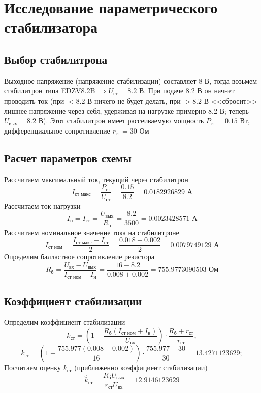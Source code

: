 \documentclass[a4paper, 12pt]{article}
\begin{document}
    \section{Исследование параметрического стабилизатора}
    \subsection{Выбор стабилитрона}
    Выходное напряжение (напряжение стабилизации) составляет 8 В, тогда возьмем стабилитрон типа EDZV8.2B $\Rightarrow U_{\text{ст}}=8.2$ В.
    При подаче 8.2 В он начнет проводить ток (при $<8.2$ В ничего не будет делать, при $>8.2$ В <<сбросит>>
    лишнее напряжение через себя, удерживая на нагрузке примерно 8.2 В; теперь $U_{\text{вых}}=8.2$ В). Этот стабилитрон имеет рассеиваемую
    мощность $P_\text{ст}=0.15$ Вт, дифференциальное сопротивление $r_{\text{ст}}=30$ Ом
    
    
    \subsection{Расчет параметров схемы}
    Рассчитаем максимальный ток, текущий
    через стабилитрон
    $$
    I_{\text{ст макс}}=\dfrac{P_{\text{ст}}}{U_{\text{ст}}}=\dfrac{0.15}{8.2}=0.0182926829\text{ А}
    $$
    Рассчитаем ток нагрузки
    $$
    I_{\text{н}}=I_{\text{ст}}=\dfrac{U_{\text{вых}}}{R_{\text{н}}}=\dfrac{8.2}{3500}=0.0023428571\text{ А}
    $$
    Рассчитаем номинальное значение тока на стабилитроне
    $$
    I_{\text{ст ном}}=\dfrac{I_{\text{ст макс}}-I_{\text{ст}}}{2}=\dfrac{0.018-0.002}{2}=0.0079749129\text{ А}
    $$
    Определим балластное сопротивление резистора
    $$
    R_{\text{б}}=\dfrac{U_{\text{вх}}-U_{\text{вых}}}{I_{\text{ст ном}}+I_{\text{н}}}=\dfrac{16-8.2}{0.008+0.002}=755.9773090503\text{ Ом}
    $$


    \subsection{Коэффициент стабилизации}
    Определим коэффициент стабилизации
    $$
    k_{\text{ст}}=\left( 1-\dfrac{R_{\text{б}}\left( I_\text{ст ном}+I_{\text{н}} \right)}{U_{\text{вх}}} \right)\cdot\dfrac{R_{\text{б}}+r_{\text{ст}}}{r_{\text{ст}}},
    $$
    $$
    k_{\text{ст}}=\left( 1-\dfrac{755.977\left( 0.008+0.002 \right)}{16} \right)\cdot\dfrac{755.977+30}{30}=13.4271123629;
    $$
    Посчитаем оценку $k_{\text{ст}}$ (приближенно коэффициент стабилизации)
    $$
    \hat{k}_{\text{ст}}=\dfrac{R_{\text{б}}U_{\text{вых}}}{r_{\text{ст}}U_{\text{вх}}}=12.9146123629
    $$
\end{document}
